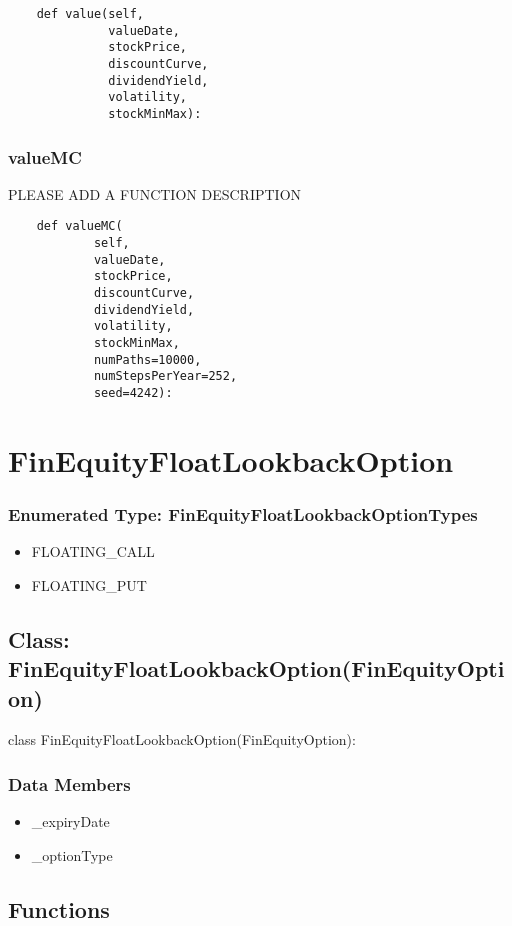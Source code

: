 \documentclass[twoside,11pt]{book}
\begin{document}
\begin{lstlisting}
    def value(self,
              valueDate,
              stockPrice,
              discountCurve,
              dividendYield,
              volatility,
              stockMinMax):
\end{lstlisting}

\subsubsection*{{\bf valueMC}}
PLEASE ADD A FUNCTION DESCRIPTION

\begin{lstlisting}
    def valueMC(
            self,
            valueDate,
            stockPrice,
            discountCurve,
            dividendYield,
            volatility,
            stockMinMax,
            numPaths=10000,
            numStepsPerYear=252,
            seed=4242):
\end{lstlisting}

\newpage
\section{FinEquityFloatLookbackOption}

\subsubsection{Enumerated Type: FinEquityFloatLookbackOptionTypes}
\begin{itemize}
\item{FLOATING\_CALL}
\item{FLOATING\_PUT}
\end{itemize}

\subsection*{Class: FinEquityFloatLookbackOption(FinEquityOption)}
class FinEquityFloatLookbackOption(FinEquityOption): 

\subsubsection*{Data Members}
\begin{itemize}
\item{\_expiryDate}
\item{\_optionType}
\end{itemize}

\subsection*{Functions}
\end{document}
